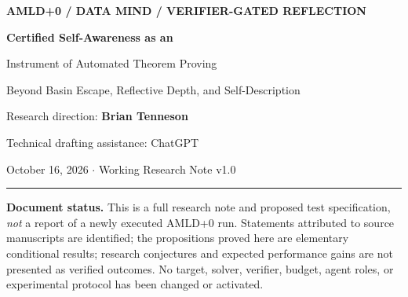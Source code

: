 \documentclass[11pt,letterpaper]{article}
\begin{document}
\begin{center}
{\footnotesize\sffamily\bfseries\color{accent} AMLD+0 / DATA MIND / VERIFIER-GATED REFLECTION}\par
\vspace{8pt}
{\LARGE\bfseries\color{ink} Certified Self-Awareness as an\par Instrument of Automated Theorem Proving}\par
\vspace{7pt}
{\large Beyond Basin Escape, Reflective Depth, and Self-Description}\par
\vspace{13pt}
{\normalsize Research direction: \textbf{Brian Tenneson}}\par
{\small Technical drafting assistance: ChatGPT}\par
\vspace{5pt}
{\small October 16, 2026 \quad $\cdot$ \quad Working Research Note v1.0}\par
\vspace{10pt}
\rule{.86\linewidth}{.5pt}
\end{center}

\begin{statusbox}
\textbf{Document status.} This is a full research note and proposed test specification, \emph{not} a report of a newly executed AMLD+0 run. Statements attributed to source manuscripts are identified; the propositions proved here are elementary conditional results; research conjectures and expected performance gains are not presented as verified outcomes. No target, solver, verifier, budget, agent roles, or experimental protocol has been changed or activated.
\end{statusbox}
\end{document}
